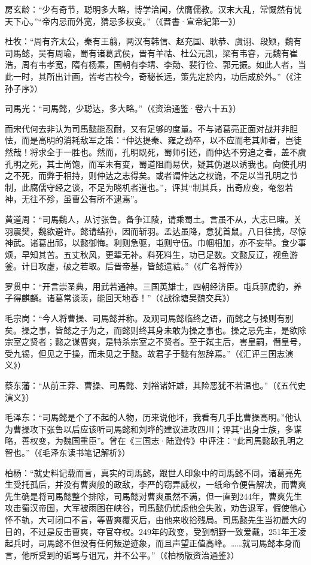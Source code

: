 房玄龄：“少有奇节，聪明多大略，博学洽闻，伏膺儒教。汉末大乱，常慨然有忧天下心。”“帝内忌而外宽，猜忌多权变。”（《晋書·宣帝紀第一》）

杜牧：“周有齐太公，秦有王翦，两汉有韩信、赵充国、耿恭、虞诩、段颎，魏有司馬懿，吴有周瑜，蜀有诸葛武侯，晋有羊祜、杜公元凯，梁有韦睿，元魏有崔浩，周有韦孝宽，隋有杨素，国朝有李靖、李勣、裴行俭、郭元振。如此人者，当此一时，其所出计画，皆考古校今，奇秘长远，策先定於内，功后成於外。”（《注孙子序》）

司馬光：“司馬懿，少聪达，多大略。”（《资治通鉴·卷六十五》）

而宋代何去非认为司馬懿能忍耐，又有足够的度量。不与诸葛亮正面对战并非胆怯，而是高明的消耗敌军之策：“仲达提秦、雍之劲卒，以不应而老其师者，岂徒然哉！将求全于一胜也。然而，孔明既死，蜀师引还，而仲达不穷追之者，盖不虞孔明之死，其士尚饱，而军未有变，蜀道阻而易伏，疑其伪退以诱我也。向使孔明之不死，而弊于相持，则仲达之志得矣。或者谓仲达之权诡，不足以当孔明之节制，此腐儒守经之谈，不足为晓机者道也。”，评其“制其兵，出奇应变，奄忽若神，无往不殄，虽曹公有所不逮焉”。

黄道周：“司馬魏人，从讨张鲁。备争江陵，请乘蜀土。言虽不从，大志已睹。关羽震樊，魏欲避许。懿请结孙，因而斩羽。孟达虽降，意犹首鼠。八日往擒，尽惊神武。诸葛出祁，以懿御悔。利则急驱，屯则守伍。巾帼相加，亦不妄举。食少事烦，早知其苦。五丈秋风，更辈无补。料死料生，功已足数。文懿反辽，视鱼游釜。计日攻虚，破之若取。后晋帝基，皆懿遗祜。”（《广名将传》）

罗贯中：“开言崇圣典，用武若通神。三国英雄士，四朝经济臣。屯兵驱虎豹，养子得麒麟。诸葛常谈羡，能回天地春！”（《战徐塘吴魏交兵》）

毛宗岗：“今人将曹操、司馬懿并称。及观司馬懿临终之语，而懿之与操则有别矣。操之事，皆懿之子为之，而懿则终其身未敢为操之事也。操之忌先主，是欲除宗室之贤者；懿之谋曹爽，是特杀宗室之不贤者。至于弑主后，害皇嗣，僭皇号，受九锡，但见之于操，而未见之于懿。故君子于懿有恕辞焉。”（《汇评三国志演义》）

蔡东藩：“从前王莽、曹操、司馬懿、刘裕诸奸雄，其险恶犹不若温也。”（《五代史演义》）

毛泽东：“司馬懿是个了不起的人物，历来说他坏，我看有几手比曹操高明。”他认为曹操攻下张鲁以后应该听司馬懿和刘晔的建议进攻四川；评其“出身士族，多谋略，善权变，为魏国重臣”。曾在《三国志·陆逊传》中评注：“此司馬懿敌孔明之智也。”（《毛泽东读书笔记解析》）

柏杨：“就史料记载而言，真实的司馬懿，跟世人印象中的司馬懿不同，诸葛亮先生受托孤后，并没有曹爽般的政敌，李严的窃弄威权，一纸命令便告解决，而曹爽先生确是将司馬懿整个排除，司馬懿对曹爽虽然不满，但一直到244年，曹爽先生攻击蜀汉帝国，大军被雨困在峡谷，司馬懿仍忧虑他会失败，劝告退军，假使他心怀不轨，大可闭口不言，等曹爽覆灭后，由他来收拾残局。司馬懿先生当初最大的目的，不过是反击曹爽，夺官夺权。249年的政变，受到朝野一致爱戴，251年王凌起兵时，司馬懿不但没有任何叛逆迹象，而且声望正值高峰。……就司馬懿本身而言，他所受到的诟骂与诅咒，并不公平。”（《柏杨版资治通鉴》）

